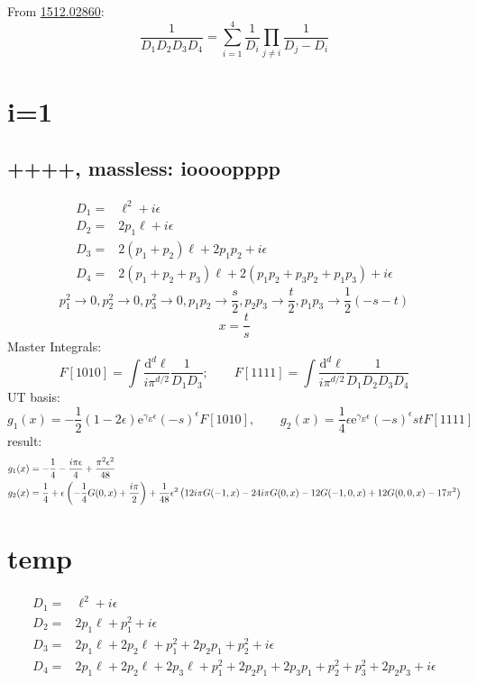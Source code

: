 \documentclass{article}
\title{}
\author{}
\date{}
\numberwithin{equation}{section}
\newcommand{\dd}{\mathrm{d}}
\newcommand{\ee}{\mathrm{e}}
\begin{document}
From \href{https://arxiv.org/pdf/1512.02860.pdf}{1512.02860}: 
\begin{equation}
	\frac{1}{D_1D_2D_3D_4}=\sum_{i=1}^{4}\frac{1}{D_i}\prod_{j\ne i}\frac{1}{D_j-D_i}
\end{equation}
\section{i=1}
\subsection{ ++++, massless: ioooopppp}


	\begin{align}
	D_1=&\ell ^2+i \epsilon  \\
	D_2=&2 p_1 \ell +i \epsilon  \\
	D_3=&2 \left(p_1+p_2\right) \ell +2 p_1 p_2+i \epsilon  \\
	D_4=&2 \left(p_1+p_2+p_3\right) \ell +2 \left(p_1 p_2+p_3 p_2+p_1 p_3\right)+i \epsilon  
	\end{align}
\begin{equation}
	p_1^2\to 0,p_2^2\to 0,p_3^2\to 0,p_1 p_2\to \frac{s}{2},p_2 p_3\to \frac{t}{2},p_1 p_3\to
	\frac{1}{2} (-s-t)
\end{equation}
\begin{equation}
	x=\frac{t}{s}
\end{equation}
Master Integrals:
\begin{equation}
	F[1010]=\int\frac{\dd^d\ell}{i\pi^{d/2}}\frac{1}{D_1D_3};\qquad F[1111]=\int\frac{\dd^d\ell}{i\pi^{d/2}}\frac{1}{D_1D_2D_3D_4}
\end{equation}
UT basis:
\begin{equation}
	g_1(x)=-\frac12(1-2\epsilon)\ee^{\gamma_E\epsilon}(-s)^{\epsilon}F[1010],\qquad g_2(x)=\frac14\epsilon\ee^{\gamma_E\epsilon}(-s)^{\epsilon}s tF[1111]
\end{equation}
result:
\begin{align}
	&g_1(x)=-\frac{1}{4}-\frac{i \pi  \epsilon }{4}+\frac{\pi ^2 \epsilon ^2}{48}\\
	&g_2(x)=\frac{1}{4}+\epsilon  \left(-\frac{1}{4} G(0,x)+\frac{i \pi }{2}\right)
	+\frac{1}{48} \epsilon ^2 \left(12 i \pi  G(-1,x)-24 i \pi  G(0,x)-12 G(-1,0,x)+12 G(0,0,x)-17 \pi ^2\right)\notag
\end{align}
\section{temp}
\begin{align}
D_1=&\ell ^2+i \epsilon \\
D_2=&2 p_1 \ell +p_1^2+i \epsilon \\
D_3=&2 p_1 \ell +2 p_2 \ell +p_1^2+2 p_2 p_1+p_2^2+i \epsilon \\
D_4=&2 p_1 \ell +2 p_2 \ell +2 p_3 \ell +p_1^2+2 p_2 p_1+2 p_3 p_1+p_2^2+p_3^2+2 p_2 p_3+i \epsilon 
\end{align}

	
\end{document}
